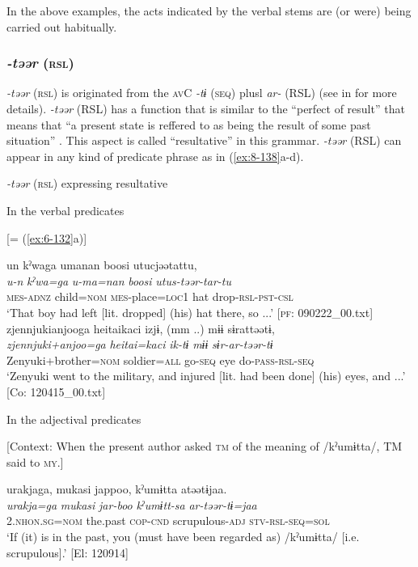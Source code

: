 In the above examples, the acts indicated by the verbal stems are (or were) being carried out habitually.

\subsubsection{\textit{-təər} (\textsc{rsl})}

\textit{-təər} (\textsc{rsl}) is originated from the \textsc{av}C \textit{-tɨ} (\textsc{seq}) plusl \textit{ar-} (RSL) (see  in  for more details). \textit{-təər} (RSL) has a function that is similar to the “perfect of result” that means that “a present state is reffered to as being the result of some past situation” \citep[56]{Comrie1976}. This aspect is called “resultative” in this grammar. \textit{-təər} (RSL) can appear in any kind of predicate phrase as in (\ref{ex:8-138}a-d).

\ea\label{ex:8-138}
  \textit{-təər} (\textsc{rsl}) expressing resultative

  In the verbal predicates

\ea {}[= (\ref{ex:6-132}a)]

{\TM}
\glll  un  kˀwaga  umanan  {\textbar}boosi{\textbar}  utucjəətattu,\\
\textit{u-n}  \textit{kˀwa=ga}  \textit{u-ma=nan}  \textit{boosi}  \textit{utus-təər-tar-tu}\\
\textsc{mes}-\textsc{adnz}  child=\textsc{nom}  \textsc{mes}-place=\textsc{loc1}  hat  drop-\textsc{rsl}-\textsc{pst}-\textsc{csl}\\
\glt ‘That boy had left [lit. dropped] (his) hat there, so ...’ [\textsc{pf}: 090222\_00.txt]
\ex
{\TM}
\glll  zjennjukianjooga  {\textbar}heitai{\textbar}kaci  izjɨ,  (mm ..)  mɨɨ      sɨrattəətɨ,        \\
\textit{zjennjuki+anjoo=ga}  \textit{heitai=kaci}  \textit{ik-tɨ}    \textit{mɨɨ}      \textit{sɨr-ar-təər-tɨ}\\
Zenyuki+brother=\textsc{nom}  soldier=\textsc{all}  go-\textsc{seq}    eye     do-\textsc{pass}-\textsc{rsl}-\textsc{seq}\\
\glt ‘Zenyuki went to the military, and injured [lit. had been done] (his) eyes, and ...’ [Co: 120415\_00.txt]

  In the adjectival predicates


\ex {}[Context: When the present author asked \textsc{tm} of the meaning of /kˀumɨtta/, TM said to \textsc{my}.]

{\TM}
\glll  urakjaga,  mukasi  jappoo,  kˀumɨtta      atəətɨjaa.\\
\textit{urakja=ga}  \textit{mukasi}  \textit{jar-boo}  \textit{kˀumɨtt-sa}      \textit{ar-təər-tɨ=jaa}\\
2.\textsc{nhon}.\textsc{sg}=\textsc{nom}  the.past  \textsc{cop}-\textsc{cnd}  scrupulous-\textsc{adj}   \textsc{stv}-\textsc{rsl}-\textsc{seq}=\textsc{sol}\\
\glt ‘If (it) is in the past, you (must have been regarded as) /kˀumɨtta/ [i.e. scrupulous].’ [El: 120914]


